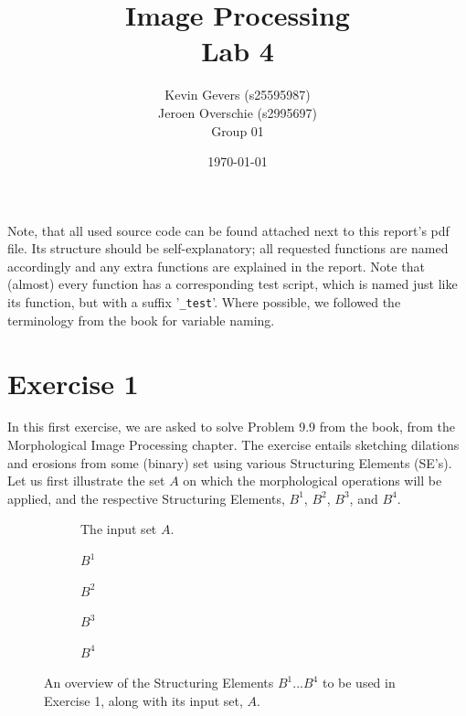 \documentclass{article}
\title{Image Processing\\
    Lab 4}
\author{Kevin Gevers (s25595987) \\ Jeroen Overschie (s2995697)\\Group 01}
\date{\today}
\begin{document}
\maketitle

Note, that all used source code can be found attached next to this report's pdf file. Its structure should be self-explanatory; all requested functions are named accordingly and any extra functions are explained in the report. Note that (almost) every function has a corresponding test script, which is named just like its function, but with a suffix '\texttt{\_test}'. Where possible, we followed the terminology from the book \citep{gonzalez2008digital} for variable naming.

\section*{Exercise 1}
In this first exercise, we are asked to solve Problem 9.9 from the book, from the Morphological Image Processing chapter. The exercise entails sketching dilations and erosions from some (binary) set using various Structuring Elements (SE's). Let us first illustrate the set $A$ on which the morphological operations will be applied, and the respective Structuring Elements, $B^1$, $B^2$, $B^3$, and $B^4$.

\begin{figure}[H]
     \centering
     \begin{subfigure}[b]{0.3\textwidth}
         \centering
         
         \caption{The input set $A$.}
         \label{fig:set_A}
     \end{subfigure}
     \hfill
     \begin{subfigure}[b]{0.08\textwidth}
         \centering
         
         \caption{$B^1$}
         \label{fig:SE_B1}
     \end{subfigure}
     \hfill
     \begin{subfigure}[b]{0.15\textwidth}
         \centering
         
         \caption{$B^2$}
         \label{fig:SE_B2}
     \end{subfigure}
     \hfill
     \begin{subfigure}[b]{0.11\textwidth}
         \centering
         
         \caption{$B^3$}
         \label{fig:SE_B3}
     \end{subfigure}
     \hfill
     \begin{subfigure}[b]{0.18\textwidth}
         \centering
         
         \caption{$B^4$}
         \label{fig:SE_B4}
     \end{subfigure}
     
    \caption{An overview of the Structuring Elements $B^1 ... B^4$ to be used in Exercise 1, along with its input set, $A$.}
    \label{fig:ex1_overview}
\end{figure}
\end{document}

